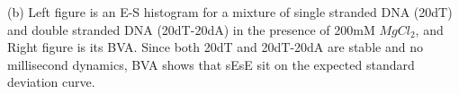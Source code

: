\label{fig:bva_static}(b) Left figure is an E-S histogram for a mixture of single stranded DNA (20dT) and double stranded DNA (20dT-20dA) in the presence of 200mM $MgCl_2$, and Right figure is its BVA. Since both 20dT and 20dT-20dA are stable and no millisecond dynamics, BVA shows that sEsE sit on the expected standard deviation curve.